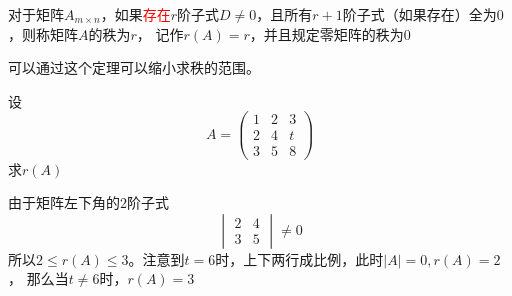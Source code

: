 \begin{definition}
    对于矩阵$A_{m\times n}$，如果\textcolor{red}{存在}$r$阶子式$D\neq 0$，且所有$r+1$阶子式（如果存在）全为$0$，则称矩阵$A$的秩为$r$，
    记作$r(A)=r$，并且规定零矩阵的秩为$0$
\end{definition}
可以通过这个定理可以缩小求秩的范围。
\begin{example}
    设
    \[
        A =
        \begin{pmatrix}
            1 & 2 & 3 \\
            2 & 4 & t \\
            3 & 5 & 8
        \end{pmatrix}
    \]
    求$r(A)$
\end{example}
\begin{solution}
    由于矩阵左下角的$2$阶子式
    \[
        \begin{vmatrix}
            2 & 4 \\
            3 & 5
        \end{vmatrix}
        \neq 0
    \]
    所以$2\leq r(A) \leq 3$。注意到$t=6$时，上下两行成比例，此时$|A|=0,r(A)=2$，
    那么当$t\neq 6$时，$r(A)=3$
\end{solution}

